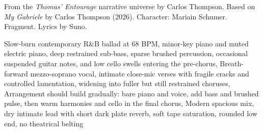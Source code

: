
\begin{notes}
From the \emph{Thomas’ Entourage} narrative universe by Carlos Thompson. Based on \emph{My Gabriele} by Carlos Thompson (2026). Character: Mariain Schumer. Fragment. Lyrics by Suno.
\end{notes}
\begin{style}
Slow-burn contemporary R\&B ballad at 68 BPM, minor-key piano and muted electric piano, deep restrained sub-bass, sparse brushed percussion, occasional suspended guitar notes, and low cello swells entering the pre-chorus, Breath-forward mezzo-soprano vocal, intimate close-mic verses with fragile cracks and controlled lamentation, widening into fuller but still restrained choruses, Arrangement should build gradually: bare piano and voice, add bass and brushed pulse, then warm harmonies and cello in the final chorus, Modern spacious mix, dry intimate lead with short dark plate reverb, soft tape saturation, rounded low end, no theatrical belting
\end{style}
